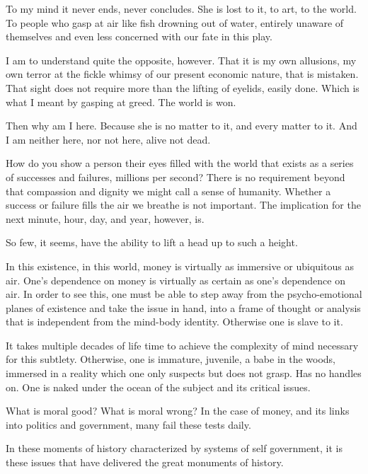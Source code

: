 To my mind it never ends, never concludes.  She is lost to it, to art,
to the world.  To people who gasp at air like fish drowning out of
water, entirely unaware of themselves and even less concerned with our
fate in this play.

I am to understand quite the opposite, however.  That it is my own
allusions, my own terror at the fickle whimsy of our present economic
nature, that is mistaken.  That sight does not require more than the
lifting of eyelids, easily done.  Which is what I meant by gasping at
greed.  The world is won.

Then why am I here.  Because she is no matter to it, and every matter
to it.  And I am neither here, nor not here, alive not dead.

How do you show a person their eyes filled with the world that exists
as a series of successes and failures, millions per second?  There is
no requirement beyond that compassion and dignity we might call a
sense of humanity.  Whether a success or failure fills the air we
breathe is not important.  The implication for the next minute, hour,
day, and year, however, is.

So few, it seems, have the ability to lift a head up to such a height.

\vfill
\break

In this existence, in this world, money is virtually as immersive or
ubiquitous as air.  One's dependence on money is virtually as certain
as one's dependence on air.  In order to see this, one must be able to
step away from the psycho-emotional planes of existence and take the
issue in hand, into a frame of thought or analysis that is independent
from the mind-body identity.  Otherwise one is slave to it.

It takes multiple decades of life time to achieve the complexity of
mind necessary for this subtlety.  Otherwise, one is immature,
juvenile, a babe in the woods, immersed in a reality which one only
suspects but does not grasp.  Has no handles on.  One is naked under
the ocean of the subject and its critical issues.

What is moral good?  What is moral wrong?  In the case of money, and
its links into politics and government, many fail these tests daily.

In these moments of history characterized by systems of self
government, it is these issues that have delivered the great monuments
of history.

\vfill
\bye
